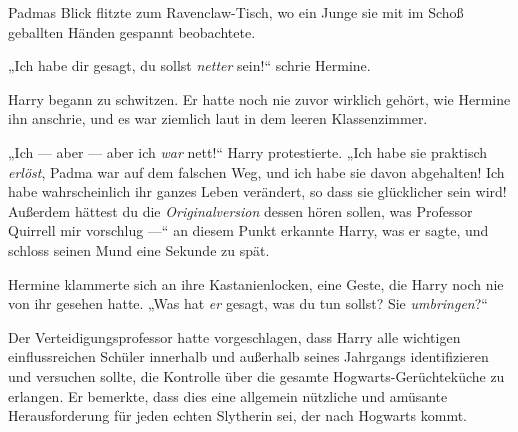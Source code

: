 Padmas Blick flitzte zum Ravenclaw-Tisch, wo ein Junge sie mit im Schoß geballten Händen gespannt beobachtete.



„Ich habe dir gesagt, du sollst \emph{netter} sein!“ schrie Hermine.

Harry begann zu schwitzen. Er hatte noch nie zuvor wirklich gehört, wie Hermine ihn anschrie, und es war ziemlich laut in dem leeren Klassenzimmer.

„Ich — aber — aber ich \emph{war} nett!“ Harry protestierte.
„Ich habe sie praktisch \emph{erlöst}, Padma war auf dem falschen Weg, und ich habe sie davon abgehalten! Ich habe wahrscheinlich ihr ganzes Leben verändert, so dass sie glücklicher sein wird! Außerdem hättest du die \emph{Originalversion} dessen hören sollen, was Professor Quirrell mir vorschlug —“ an diesem Punkt erkannte Harry, was er sagte, und schloss seinen Mund eine Sekunde zu spät.

Hermine klammerte sich an ihre Kastanienlocken, eine Geste, die Harry noch nie von ihr gesehen hatte.
„Was hat \emph{er} gesagt, was du tun sollst? Sie \emph{umbringen}?“

Der Verteidigungsprofessor hatte vorgeschlagen, dass Harry alle wichtigen einflussreichen Schüler innerhalb und außerhalb seines Jahrgangs identifizieren und versuchen sollte, die Kontrolle über die gesamte Hogwarts-Gerüchteküche zu erlangen. Er bemerkte, dass dies eine allgemein nützliche und amüsante Herausforderung für jeden echten Slytherin sei, der nach Hogwarts kommt.

